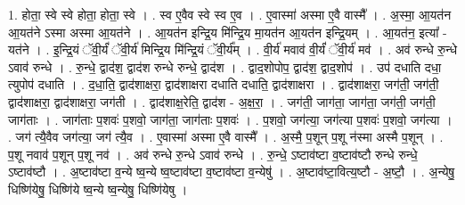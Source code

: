 \documentclass[17pt]{extarticle}
\begin{document}
1. होता॒ स्वे स्वे होता॒ होता॒ स्वे । . स्व ए॒वैव स्वे स्व ए॒व । . ए॒वास्मा॑ अस्मा ए॒वै वास्मै᳚ । . अ॒स्मा॒ आ॒यत॑न आ॒यत॑ने ऽस्मा अस्मा आ॒यत॑ने । . आ॒यत॑न इन्द्रि॒य मि॑न्द्रि॒य मा॒यत॑न आ॒यत॑न इन्द्रि॒यम् । . आ॒यत॑न॒ इत्या᳚ - यत॑ने । . इ॒न्द्रि॒यं ॅवी॒र्यं॑ ॅवी॒र्य॑ मिन्द्रि॒य मि॑न्द्रि॒यं ॅवी॒र्य᳚म् । . वी॒र्य॑ मवाव॑ वी॒र्यं॑ ॅवी॒र्य॑ मव॑ । . अव॑ रुन्धे रु॒न्धे ऽवाव॑ रुन्धे । . रु॒न्धे॒ द्वाद॑श॒ द्वाद॑श रुन्धे रुन्धे॒ द्वाद॑श । . द्वाद॒शोपोप॒ द्वाद॑श॒ द्वाद॒शोप॑ । . उप॑ दधाति दधा॒ त्युपोप॑ दधाति । . द॒धा॒ति॒ द्वाद॑शाक्षरा॒ द्वाद॑शाक्षरा दधाति दधाति॒ द्वाद॑शाक्षरा । . द्वाद॑शाक्षरा॒ जग॑ती॒ जग॑ती॒ द्वाद॑शाक्षरा॒ द्वाद॑शाक्षरा॒ जग॑ती । . द्वाद॑शाक्ष॒रेति॒ द्वाद॑श - अ॒क्ष॒रा॒ । . जग॑ती॒ जाग॑ता॒ जाग॑ता॒ जग॑ती॒ जग॑ती॒ जाग॑ताः । . जाग॑ताः प॒शवः॑ प॒शवो॒ जाग॑ता॒ जाग॑ताः प॒शवः॑ । . प॒शवो॒ जग॑त्या॒ जग॑त्या प॒शवः॑ प॒शवो॒ जग॑त्या । . जग॑ त्यै॒वैव जग॑त्या॒ जग॑ त्यै॒व । . ए॒वास्मा॑ अस्मा ए॒वै वास्मै᳚ । . अ॒स्मै॒ प॒शून् प॒शू न॑स्मा अस्मै प॒शून् । . प॒शू नवाव॑ प॒शून् प॒शू नव॑ । . अव॑ रुन्धे रु॒न्धे ऽवाव॑ रुन्धे । . रु॒न्धे॒ ऽष्टाव॑ष्टा व॒ष्टाव॑ष्टौ रुन्धे रुन्धे॒ ऽष्टाव॑ष्टौ । . अ॒ष्टाव॑ष्टा व॒न्ये ष्व॒न्ये ष्व॒ष्टाव॑ष्टा व॒ष्टाव॑ष्टा व॒न्येषु॑ । . अ॒ष्टाव॑ष्टा॒वित्य॒ष्टौ - अ॒ष्टौ॒ । . अ॒न्येषु॒ धिष्णि॑येषु॒ धिष्णि॑ये ष्व॒न्ये ष्व॒न्येषु॒ धिष्णि॑येषु । \newline
\end{document}
